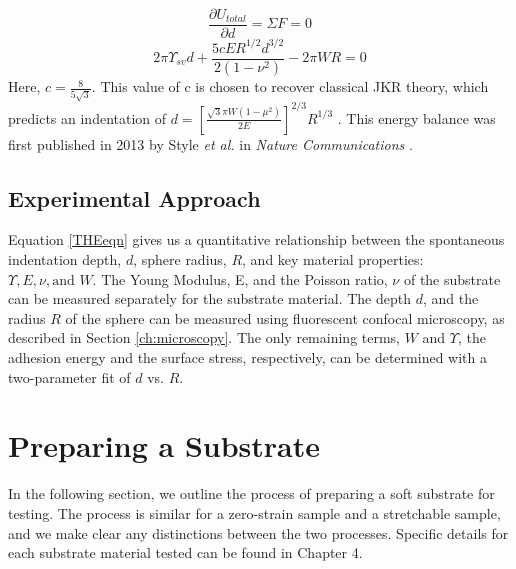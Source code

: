 \begin{equation*}
\frac{\partial U_{total}}{\partial d} = \Sigma F = 0
\end{equation*}
\begin{equation}
\label{THEeqn}
2 \pi \Upsilon_{sv}d  + \frac{5cER^{1/2}d^{3/2}}{2 \left( 1-\nu ^2 \right) }  - 2 \pi WR = 0
\end{equation}
Here,  $ c = \frac{8}{5\sqrt{3}} $. This value of c is chosen to recover classical JKR theory, which predicts an indentation of $ d =  \left[\frac{\sqrt{3}\pi W (1 - \mu^2)}{2E} \right]^{2/3}R^{1/3}$ \cite{style2013surface, jensen2015wetting,johnson1971surface}. This energy balance was first published in 2013 by Style \textit{et al.} in \textit{Nature Communications} \cite{style2013surface}. 

\subsection{Experimental Approach}
Equation \ref{THEeqn} gives us a quantitative relationship between the spontaneous indentation depth, $ d $, sphere radius, $ R $, and key material properties: $ \Upsilon, E, \nu, \text{and }W $. The Young Modulus, E, and the Poisson ratio, $\nu$ of the substrate can be measured separately for the substrate material. The depth $d$, and the radius $R$ of the sphere can be measured using fluorescent confocal microscopy, as described in Section \ref{ch:microscopy}. The only remaining terms, $W$ and $\Upsilon$, the adhesion energy and the surface stress, respectively, can be determined with a two-parameter fit of $ d $ vs. $ R. $

\section{Preparing a Substrate}
In the following section, we outline the process of preparing a soft substrate for testing. The process is similar for a zero-strain sample and a stretchable sample, and we make clear any distinctions between the two processes. Specific details for each substrate material tested can be found in Chapter 4.

